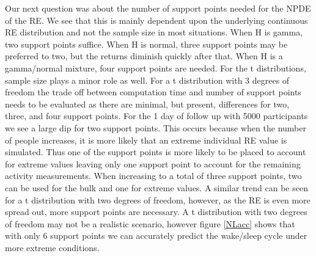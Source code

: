 \documentclass{article}
\begin{document}
Our next question was about the number of support points needed 
for the NPDE of the RE. We see that this is mainly dependent upon 
the underlying continuous RE distribution and not the sample size 
in most situations. When H is gamma, two support points suffice. 
When H is normal, three support points may be preferred to two, 
but the returns diminish quickly after that. When H is a gamma/normal 
mixture, four support points are needed. For the t distributions, 
sample size plays a minor role as well. For a t distribution with 3 
degrees of freedom the trade off between computation time and number 
of support points needs to be evaluated as there are minimal, but present, 
differences for two, three, and four support points. For the 1 day of 
follow up with 5000 participants we see a large dip for two support points. 
This occurs because when the number of people increases, it is more 
likely that an extreme individual RE value is simulated. Thus one of
the support points is more likely to be placed to account for extreme 
values leaving only one support point to account for the remaining 
activity measurements. When increasing to a total of three support 
points, two can be used for the bulk and one for extreme values. 
A similar trend can be seen for a t distribution with two degrees 
of freedom, however, as the RE is even more spread out, more support 
points are necessary. A t distribution with two degrees of freedom 
may not be a realistic scenario, however figure \ref{NLacc} shows 
that with only 6 support points we can accurately predict the wake/sleep
 cycle under more extreme conditions. 
\end{document}
